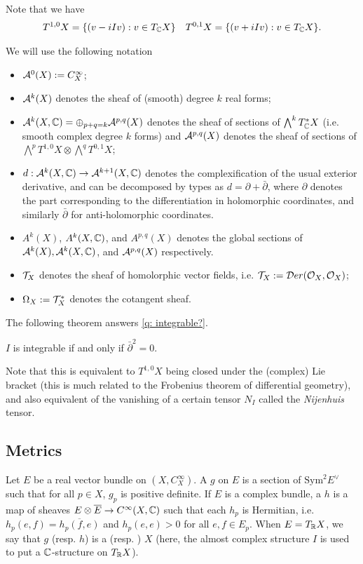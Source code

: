 Note that we have
\begin{align*}
	T^{1,0}X=\{(v-iIv):v\in T_\mathbb C X\}&&T^{0,1}X=\{(v+iIv):v\in T_\mathbb C X\}.
\end{align*}
\begin{notation}
	We will use the following notation
	\begin{itemize}
		\item $\mathcal{A}^0(X):=C^\infty_X$;
		\item $\mathcal{A}^k(X)$ denotes the sheaf of (smooth) degree $k$ real forms;
		\item $\mathcal{A}^k(X,\mathbb C)=\oplus_{p+q=k}\mathcal{A}^{p,q}(X)$ denotes the sheaf of sections of $\bigwedge^kT_\mathbb C^*X$ (i.e. smooth complex degree $k$ forms) and $\mathcal{A}^{p,q}(X)$ denotes the sheaf of sections of $\bigwedge^pT^{1,0}X\otimes \bigwedge^q T^{0,1}X$;
		\item $d:\mathcal{A}^k(X,\mathbb C)\to \mathcal{A}^{k+1}(X,\mathbb C)$ denotes the complexification of the usual exterior derivative, and can be decomposed by types as $d=\partial+\bar\partial$, where $\partial$ denotes the part corresponding to the differentiation in holomorphic coordinates, and similarly $\bar\partial$ for anti-holomorphic coordinates.
		\item $A^k(X)$, $A^k(X,\mathbb C)$, and $A^{p,q}(X)$ denotes the global sections of $\mathcal{A}^k(X),\mathcal{A}^k(X,\mathbb C)$, and $\mathcal{A}^{p,q}(X)$ respectively.\
		\item $\mathcal{T}_X$ denotes the sheaf of homolorphic vector fields, i.e. $\mathcal{T}_X:=\mathcal{D} er(\mathcal{O}_X,\mathcal{O}_X)$;
		\item $\Omega_X:=\mathcal{T}_X^*$ denotes the cotangent sheaf.\qedbarhere
	\end{itemize}
\end{notation}
The following theorem answers \autoref{q: integrable?}.
\begin{theorem}
	$I$ is integrable if and only if $\bar{\partial}^2=0$.
\end{theorem}
Note that this is equivalent to $T^{1,0}X$ being closed under the (complex) Lie bracket (this is much related to the Frobenius theorem of differential geometry), and also equivalent of the vanishing of a certain tensor $N_I$ called the \emph{Nijenhuis} tensor. 
\subsection{Metrics}
Let $E$ be a real vector bundle on $(X,C_X^\infty)$. A  $g$ on $E$ is a section of $\text{Sym}^2E^\vee$ such that for all $p\in X$, $g_p$ is positive definite. If $E$ is a complex bundle, a  $h$ is a map of sheaves $E\otimes \overline E\to C^\infty(X,\mathbb C)$ such that each $h_p$ is Hermitian, i.e. $h_p(e,f)=\overline{h_p(f,e)}$ and $h_p(e,e)>0$ for all $e,f\in E_p$.  When $E=T_\mathbb R X$, we say that $g$ (resp. $h$) is a  (resp. )  $X$ (here, the almost complex structure $I$ is used to put a $\mathbb C$-structure on $T_\mathbb R X$).

